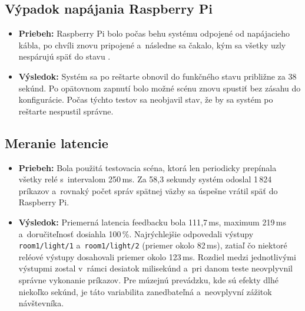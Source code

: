 \subsection{Výpadok napájania Raspberry Pi}
\begin{itemize}
    \item \textbf{Priebeh:} Raspberry Pi bolo počas behu systému odpojené od napájacieho kábla,
        po chvíli znovu pripojené a~následne sa čakalo, kým sa všetky uzly nespárujú späť do stavu .
    \item \textbf{Výsledok:} Systém sa po reštarte obnovil do funkčného stavu približne za 38 sekúnd.
        Po opätovnom zapnutí bolo možné scénu znovu spustiť bez zásahu do konfigurácie.
        Počas týchto testov sa neobjavil stav, že by sa systém po reštarte nespustil správne.
\end{itemize}

\subsection{Meranie latencie}
\begin{itemize}
    \item \textbf{Priebeh:} Bola použitá testovacia scéna, ktorá len periodicky prepínala všetky relé
        s~intervalom 250\,ms. Za 58{,}3 sekundy systém odoslal 1\,824 príkazov a~rovnaký počet správ spätnej väzby
        sa úspešne vrátil späť do Raspberry Pi.
    \item \textbf{Výsledok:} Priemerná latencia feedbacku bola 111{,}7\,ms, maximum 219\,ms a~doručiteľnosť
        dosiahla 100\,\%. Najrýchlejšie odpovedali výstupy \texttt{room1/light/1} a~\texttt{room1/light/2}
        (priemer okolo 82\,ms), zatiaľ čo niektoré reléové výstupy dosahovali priemer okolo 123\,ms.
        Rozdiel medzi jednotlivými výstupmi zostal v~rámci desiatok milisekúnd a~pri danom teste
        neovplyvnil správne vykonanie príkazov. Pre múzejnú prevádzku, kde sú efekty
        dlhé niekoľko sekúnd, je táto variabilita zanedbateľná a~neovplyvní zážitok návštevníka.
\end{itemize}

